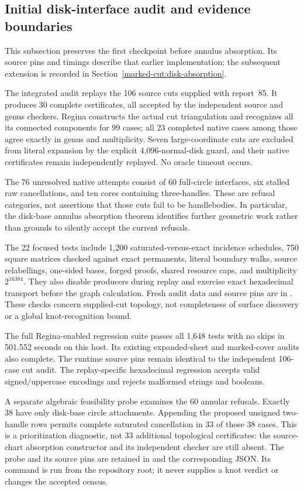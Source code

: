 \subsection{Initial disk-interface audit and evidence boundaries}

This subsection preserves the first checkpoint before annulus absorption.
Its source pins and timings describe that earlier implementation; the
subsequent extension is recorded in Section~\ref{marked-cut:disk-absorption}.

The integrated audit replays the 106 source cuts supplied with report~85.
It produces 30 complete certificates, all accepted by the independent
source and genus checkers. Regina constructs the actual cut triangulation
and recognizes all its connected components for 99 cases; all 23 completed
native cases among those agree exactly in genus and multiplicity. Seven
large-coordinate cuts are excluded from literal expansion by the explicit
4,096-normal-disk guard, and their native certificates remain independently
replayed. No oracle timeout occurs.

The 76 unresolved native attempts consist of 60 full-circle interfaces,
six stalled raw cancellations, and ten cores containing three-handles.
These are refusal categories, not assertions that those cuts fail to be
handlebodies. In particular, the disk-base annulus absorption theorem
identifies further geometric work rather than grounds to silently accept
the current refusals.

The 22 focused tests include 1,200 saturated-versus-exact incidence schedules,
750 square matrices checked against exact permanents, literal boundary walks,
source relabellings, one-sided bases, forged proofs, shared resource caps,
and multiplicity $2^{16384}$. They also disable producers during replay and
exercise exact hexadecimal transport before the graph calculation.
Fresh audit data and source pins are in
. These checks concern supplied-cut topology,
not completeness of surface discovery or a global knot-recognition bound.

The full Regina-enabled regression suite passes all 1,648 tests with no
skips in 501.552 seconds on this host. Its existing expanded-sheet and
marked-cover audits also complete. The runtime source pins remain identical
to the independent 106-case cut audit. The replay-specific hexadecimal
regression accepts valid signed/uppercase encodings and rejects malformed
strings and booleans.

A separate algebraic feasibility probe examines the 60 annular refusals.
Exactly 38 have only disk-base circle attachments. Appending the proposed
unsigned two-handle rows permits complete saturated cancellation in 33 of
those 38 cases. This is a prioritization diagnostic, not 33 additional
topological certificates: the source-chart absorption constructor and its
independent checker are still absent. The probe and its source pins are
retained in  and the corresponding
JSON. Its command is run from the repository root; it never supplies a knot
verdict or changes the accepted census.


